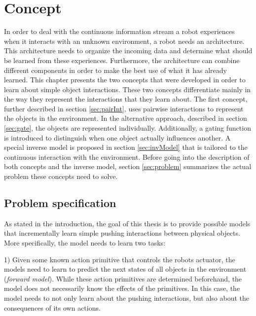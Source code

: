 \chapter{Concept \label{chap:concept}}


In order to deal with the continuous information stream a robot experiences when it interacts with an unknown environment, a robot needs an architecture.
This architecture needs to organize the incoming data and determine what should be learned from these experiences. Furthermore, the architecture can combine different components in order to make the best use of what it has already learned. 
This chapter presents the two concepts that were developed in order to learn about simple object interactions. These two concepts differentiate mainly in the way they represent the interactions that they learn about. The first concept, further described in section \ref{sec:pairInt}, uses pairwise interactions to represent the objects in the environment. In the alternative approach, described in section \ref{sec:gate}, the objects are represented individually. Additionally, a gating function is introduced to distinguish when one object actually influences another. 
A special inverse model is proposed in section \ref{sec:invModel} that is tailored to the continuous interaction with the environment. %
Before going into the description of both concepts and the inverse model, section \ref{sec:problem} summarizes the actual problem these concepts need to solve. 

\section{Problem specification \label{sec:problem}}

As stated in the introduction, the goal of this thesis is to provide possible models that incrementally learn simple pushing interactions between physical objects. 
More specifically, the model needs to learn two tasks:

1) Given some known action primitive that controls the robots actuator, the models need to learn to predict the next states of all objects in the environment (\textit{forward model}). 
While these action primitives are determined beforehand, the model does not necessarily know the effects of the primitives. In this case, the model needs to not only learn about the pushing interactions, but also about the consequences of its own actions.


